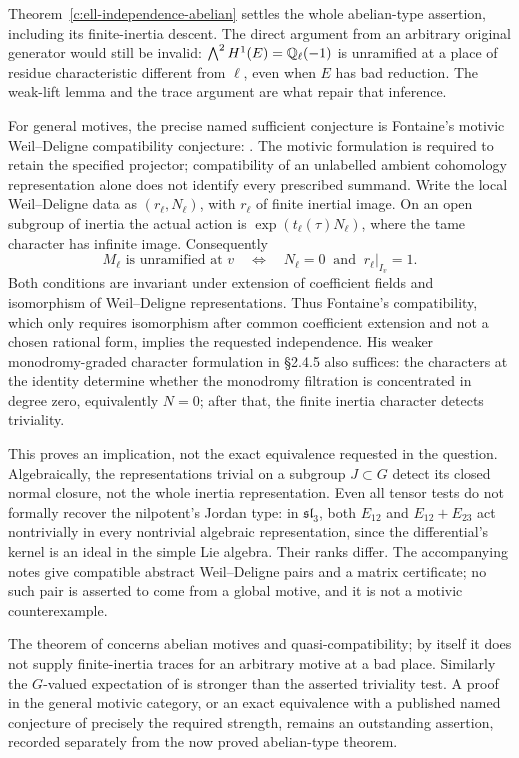\begin{remark}
\label{c:ell-independence-gate}
Theorem~\ref{c:ell-independence-abelian} settles the whole abelian-type assertion, including its finite-inertia descent. The direct argument from an arbitrary original generator would still be invalid: $\bigwedge^2H^1(E)=\mathbb Q_\ell(-1)$ is unramified at a place of residue characteristic different from $\ell$, even when $E$ has bad reduction. The weak-lift lemma and the trace argument are what repair that inference.

For general motives, the precise named sufficient conjecture is Fontaine's motivic Weil--Deligne compatibility conjecture: \citet[\S2.4.3, Conjecture $C_{\mathrm{WD}}(X,m)$, p.~342, and its motivic formulation in \S2.4.7, pp.~344--345]{c_fontaine1994pst}. The motivic formulation is required to retain the specified projector; compatibility of an unlabelled ambient cohomology representation alone does not identify every prescribed summand. Write the local Weil--Deligne data as $(r_\ell,N_\ell)$, with $r_\ell$ of finite inertial image. On an open subgroup of inertia the actual action is $\exp(t_\ell(\tau)N_\ell)$, where the tame character has infinite image. Consequently
\[
 M_\ell\text{ is unramified at }v
 \quad\Longleftrightarrow\quad
 N_\ell=0\ \text{ and }\ r_\ell|_{I_v}=1.
\]
Both conditions are invariant under extension of coefficient fields and isomorphism of Weil--Deligne representations. Thus Fontaine's compatibility, which only requires isomorphism after common coefficient extension and not a chosen rational form, implies the requested independence. His weaker monodromy-graded character formulation in \S2.4.5 also suffices: the characters at the identity determine whether the monodromy filtration is concentrated in degree zero, equivalently $N=0$; after that, the finite inertia character detects triviality.

This proves an implication, not the exact equivalence requested in the question. Algebraically, the representations trivial on a subgroup $J\subset G$ detect its closed normal closure, not the whole inertia representation. Even all tensor tests do not formally recover the nilpotent's Jordan type: in $\mathfrak{sl}_3$, both $E_{12}$ and $E_{12}+E_{23}$ act nontrivially in every nontrivial algebraic representation, since the differential's kernel is an ideal in the simple Lie algebra. Their ranks differ. The accompanying notes give compatible abstract Weil--Deligne pairs and a matrix certificate; no such pair is asserted to come from a global motive, and it is not a motivic counterexample.

The theorem of \citet[Theorem 5.1]{c_commelin2019} concerns abelian motives and quasi-compatibility; by itself it does not supply finite-inertia traces for an arbitrary motive at a bad place. Similarly the $G$-valued expectation of \citet[Conjecture 1.1]{c_kisinzhou2025} is stronger than the asserted triviality test. A proof in the general motivic category, or an exact equivalence with a published named conjecture of precisely the required strength, remains an outstanding assertion, recorded separately from the now proved abelian-type theorem.
\end{remark}

